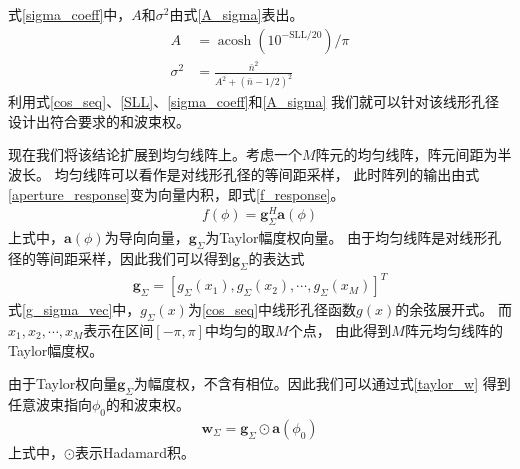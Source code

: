 \documentclass[master]{thesis-uestc}
\begin{document}
式\eqref{sigma_coeff}中，$A$和$\sigma^2$由式\eqref{A_sigma}表出。
\begin{subequations}\label{A_sigma}
    \begin{align}
        A &= \operatorname{acosh}\left(10^{-\mathrm{SLL} / 20}\right) / \pi \\
        \sigma^{2} &= \frac{\bar{n}^{2}}{A^{2}+(\bar{n}-1 / 2)^{2}}
    \end{align}
\end{subequations}
利用式\eqref{cos_seq}、\eqref{SLL}、\eqref{sigma_coeff}和\eqref{A_sigma}
我们就可以针对该线形孔径设计出符合要求的和波束权。

现在我们将该结论扩展到均匀线阵上。考虑一个$M$阵元的均匀线阵，阵元间距为半波长。
均匀线阵可以看作是对线形孔径的等间距采样，
此时阵列的输出由式\eqref{aperture_response}变为向量内积，即式\eqref{f_response}。
\begin{equation}\label{f_response}
    \begin{aligned}
        f(\phi) = \bm{g}_\Sigma^H\bm{a}(\phi)
    \end{aligned}
\end{equation}
上式中，$\bm{a}(\phi)$为导向向量，$\bm{g}_\Sigma$为Taylor幅度权向量。
由于均匀线阵是对线形孔径的等间距采样，因此我们可以得到$\bm{g}_\Sigma$的表达式
\begin{equation}\label{g_sigma_vec}
    \begin{aligned}
        \bm{g}_{\Sigma}=\left[g_{\Sigma}\left(x_{1}\right), g_{\Sigma}\left(x_{2}\right), \cdots,                     g_{\Sigma}\left(x_{M}\right)\right]^{T}
    \end{aligned}
\end{equation}
式\eqref{g_sigma_vec}中，$g_\Sigma(x)$为\eqref{cos_seq}中线形孔径函数$g(x)$的余弦展开式。
而$x_1,x_2,\cdots,x_M$表示在区间$\left[-\pi,\pi\right]$中均匀的取$M$个点，
由此得到$M$阵元均匀线阵的Taylor幅度权。

由于Taylor权向量$\bm{g}_\Sigma$为幅度权，不含有相位。因此我们可以通过式\eqref{taylor_w}
得到任意波束指向$\phi_0$的和波束权。
\begin{equation}\label{taylor_w}
    \begin{aligned}
        \bm{w}_\Sigma = \bm{g}_\Sigma \odot \bm{a}(\phi_0)
    \end{aligned}
\end{equation}
上式中，$\odot$表示Hadamard积。
\end{document}
